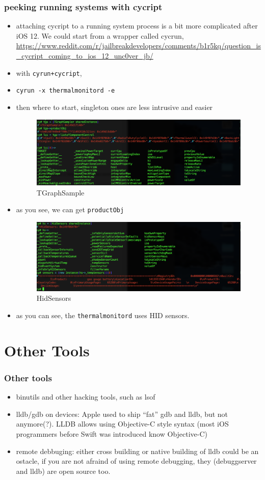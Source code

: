 \documentclass{beamer}
\begin{document}
\begin{frame}[allowframebreaks]
  \frametitle{peeking running systems with cycript}
  \begin{itemize}
  \item attaching cycript to a running system process is a bit more complicated after iOS 12. We could start from a wrapper called cycrun, \url{https://www.reddit.com/r/jailbreakdevelopers/comments/b1r5kq/question\_is\_cycript\_coming\_to\_ios\_12\_unc0ver\_jb/}
  \item with \texttt{cyrun+cycript},
  \item \texttt{cyrun -x thermalmonitord -e}
  \item then where to start, singleton ones are less intrusive and easier
    \begin{figure}
      \includegraphics[width=.8\textwidth,keepaspectratio]{cycript-1.png}
      \caption{TGraphSample}
    \end{figure}
    \item as you see, we can get \texttt{productObj}
      \begin{figure}
        \includegraphics[width=.8\textwidth,keepaspectratio]{cycript-2.png}
        \caption{HidSensors}
      \end{figure}
      \item as you can see, the \texttt{thermalmonitord} uses HID sensors.
  \end{itemize}
\end{frame}

\section{Other Tools}
\begin{frame}
  \frametitle{Other tools}
  \begin{itemize}
  \item binutils and other hacking tools, such as lsof
  \item lldb/gdb on devices: Apple used to ship ``fat'' gdb and lldb, but not anymore(?). LLDB allows using Objective-C style syntax (most iOS programmers before Swift was introduced know Objective-C)
  \item remote debbuging: either cross building or native building of lldb could be an ostacle, if you are not afraind of using remote debugging, they (debuggserver and lldb) are open source too.
  \end{itemize}
\end{frame}
\end{document}
